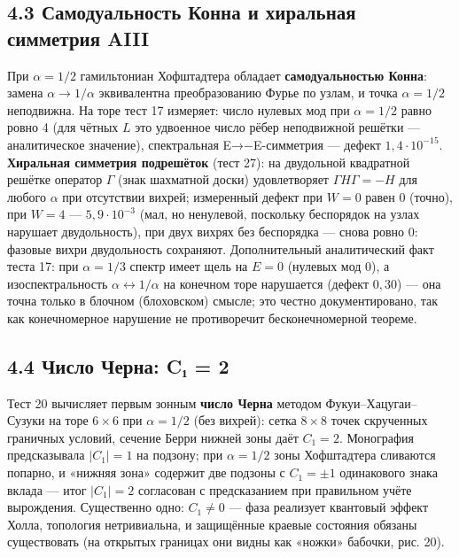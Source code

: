 \documentclass[
]{article}
\begin{document}
\subsection{4.3 Самодуальность Конна и хиральная симметрия
AIII}\label{ux441ux430ux43cux43eux434ux443ux430ux43bux44cux43dux43eux441ux442ux44c-ux43aux43eux43dux43dux430-ux438-ux445ux438ux440ux430ux43bux44cux43dux430ux44f-ux441ux438ux43cux43cux435ux442ux440ux438ux44f-aiii}

При \(\alpha=1/2\) гамильтониан Хофштадтера обладает
\textbf{самодуальностью Конна}: замена \(\alpha\to1/\alpha\)
эквивалентна преобразованию Фурье по узлам, и точка \(\alpha=1/2\)
неподвижна. На торе тест 17 измеряет: число нулевых мод при
\(\alpha=1/2\) равно ровно 4 (для чётных \(L\) это удвоенное число рёбер
неподвижной решётки --- аналитическое значение), спектральная
E→−E-симметрия --- дефект \(1{,}4\cdot10^{-15}\). \textbf{Хиральная
симметрия подрешёток} (тест 27): на двудольной квадратной решётке
оператор \(\Gamma\) (знак шахматной доски) удовлетворяет
\(\Gamma H\Gamma = -H\) для любого \(\alpha\) при отсутствии вихрей;
измеренный дефект при \(W=0\) равен \(0\) (точно), при \(W=4\) ---
\(5{,}9\cdot10^{-3}\) (мал, но ненулевой, поскольку беспорядок на узлах
нарушает двудольность), при двух вихрях без беспорядка --- снова ровно
\(0\): фазовые вихри двудольность сохраняют. Дополнительный
аналитический факт теста 17: при \(\alpha=1/3\) спектр имеет щель на
\(E=0\) (нулевых мод 0), а изоспектральность
\(\alpha\leftrightarrow1/\alpha\) на конечном торе нарушается (дефект
\(0{,}30\)) --- она точна только в блочном (блоховском) смысле; это
честно документировано, так как конечномерное нарушение не противоречит
бесконечномерной теореме.

\subsection{4.4 Число Черна: C₁ =
2}\label{ux447ux438ux441ux43bux43e-ux447ux435ux440ux43dux430-cux2081-2}

Тест 20 вычисляет первым зонным \textbf{число Черна} методом
Фукуи--Хацугаи--Сузуки на торе \(6\times6\) при \(\alpha=1/2\) (без
вихрей): сетка \(8\times8\) точек скрученных граничных условий, сечение
Берри нижней зоны даёт \(C_1 = 2\). Монография предсказывала \(|C_1|=1\)
на подзону; при \(\alpha=1/2\) зоны Хофштадтера сливаются попарно, и
«нижняя зона» содержит две подзоны с \(C_1=\pm1\) одинакового знака
вклада --- итог \(|C_1|=2\) согласован с предсказанием при правильном
учёте вырождения. Существенно одно: \(C_1\neq0\) --- фаза реализует
квантовый эффект Холла, топология нетривиальна, и защищённые краевые
состояния обязаны существовать (на открытых границах они видны как
«ножки» бабочки, рис. 20).
\end{document}
